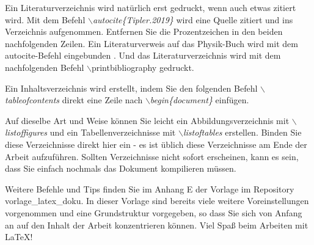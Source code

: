 \documentclass[ngerman,parskip]{scrbook}
\begin{document}
Ein Literaturverzeichnis wird natürlich erst gedruckt, wenn auch etwas zitiert
wird. Mit dem Befehl \textit{$\backslash$autocite\{Tipler.2019\}} wird eine
Quelle zitiert und ins Verzeichnis aufgenommen. Entfernen Sie die
Prozentzeichen in den beiden nachfolgenden Zeilen.
Ein Literaturverweis auf das Physik-Buch wird mit dem autocite-Befehl
eingebunden \autocite{Tipler.2019}. Und das Literaturverzeichnis wird mit dem
nachfolgenden Befehl $\backslash$printbibliography gedruckt.

Ein Inhaltsverzeichnis wird erstellt, indem Sie den folgenden Befehl
\textit{$\backslash$tableofcontents} direkt eine Zeile nach
\textit{$\backslash$begin\{document\}} einfügen.

Auf dieselbe Art und Weise können Sie leicht ein Abbildungsverzeichnis mit
\textit{$\backslash$listoffigures} und ein Tabellenverzeichnisse mit
\textit{$\backslash$listoftables} erstellen. Binden Sie diese Verzeichnisse
direkt hier ein - es ist üblich diese Verzeichnisse am Ende der Arbeit
aufzuführen. Sollten Verzeichnisse nicht sofort erscheinen, kann es sein, dass
Sie einfach nochmals das Dokument kompilieren müssen.

\printbibliography

\listoffigures

\listoftables

Weitere Befehle und Tips finden Sie im Anhang E der Vorlage im Repository \glqq
vorlage\_latex\_doku\grqq. In dieser Vorlage sind bereits viele weitere
Voreinstellungen vorgenommen und eine Grundstruktur vorgegeben, so dass Sie
sich von Anfang an auf den Inhalt der Arbeit konzentrieren können. Viel Spaß
beim Arbeiten mit \LaTeX!
\end{document}
